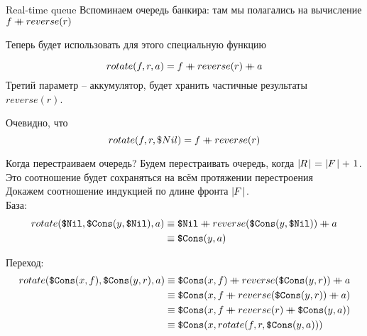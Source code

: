 \begin{frame}{Real-time queue}
Вспоминаем очередь банкира: там мы полагались на вычисление 
$f \mathbin{+\mkern-10mu+} reverse (r)$

Теперь будет использовать для этого специальную функцию 

\[
rotate (f, r, a) =  f \mathbin{+\mkern-10mu+} reverse(r) \mathbin{+\mkern-10mu+} a
\]
Третий параметр -- аккумулятор, будет хранить частичные результаты $reverse(r)$. 
\vspace{1em}

Очевидно, что 
\[
  rotate (f, r, \$Nil) =  f \mathbin{+\mkern-10mu+} reverse(r)
\]
\end{frame}

\begin{frame}{Когда перестраиваем очередь?}
Будем перестраивать очередь, когда $\card{R}\ =\ \card{F} +\ 1$. Это соотношение будет сохраняться на всём протяжении перестроения\\

Докажем соотношение индукцией по длине фронта $\mid\!\!F\!\mid$.\\

База:
\begin{equation*}
\begin{split}
rotate (\texttt{\$Nil}, \texttt{\$Cons}(y,\texttt{\$Nil}), a) 
& \equiv \texttt{\$Nil}\mathbin{+\mkern-10mu+} reverse(\texttt{\$Cons}(y,\texttt{\$Nil})) \mathbin{+\mkern-10mu+} a \\
& \equiv \texttt{\$Cons}(y,a)
\end{split}
\end{equation*}

Переход:
\begin{equation*}
\begin{split}
rotate (\cons{x}{f}, \cons{y}{r}, a) 
& \equiv \cons{x}{f} \concat  reverse(\cons{y}{r}) \concat a \\
& \equiv \cons{x}{f \concat  reverse(\cons{y}{r}) \concat a} \\
& \equiv \cons{x}{f \concat  reverse(r) \concat \cons{y}{a}} \\
& \equiv \cons{x}{rotate (f, r, \cons{y}{a})}
\end{split}
\end{equation*}
\end{frame}

